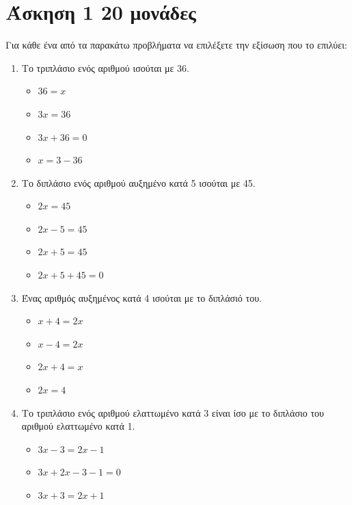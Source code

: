 \documentclass[a4paper,10pt]{report}
\begin{document}
\section*{Άσκηση 1  \hfill \small{20 μονάδες}}
Για κάθε ένα από τα παρακάτω προβλήματα να επιλέξετε την εξίσωση που το επιλύει:
\begin{enumerate}[1)]
\item Το τριπλάσιο ενός αριθμού ισούται με 36. %
\begin{multicols}{4}
\begin{itemize}
 \item $36=x$
 \item $3x=36$
 \item $3x+36=0$
 \item $x=3-36$
\end{itemize}
\end{multicols}
\item Το διπλάσιο  ενός αριθμού αυξημένο κατά 5 ισούται με 45. %
\begin{multicols}{4}
\begin{itemize}
 \item $2x=45$
 \item $2x-5=45$
 \item $2x+5=45$
 \item $2x+5+45=0$
\end{itemize}
\end{multicols}
\item Ένας αριθμός αυξημένος κατά 4 ισούται με το διπλάσιό του. %
\begin{multicols}{4}
\begin{itemize}
 \item $x+4=2x$
 \item $x-4=2x$
 \item $2x+4=x$
 \item $2x=4$
\end{itemize}
\end{multicols}
\item Το τριπλάσιο ενός αριθμού ελαττωμένο κατά 3 είναι ίσο με το διπλάσιο του αριθμού ελαττωμένο κατά 1.%
\begin{multicols}{4}
\begin{itemize}
 \item $3x-3=2x-1$
 \item $3x+2x-3-1=0$
 \item $3x+3=2x+1$

\end{itemize}
\end{multicols}
\end{enumerate}
\end{document}

